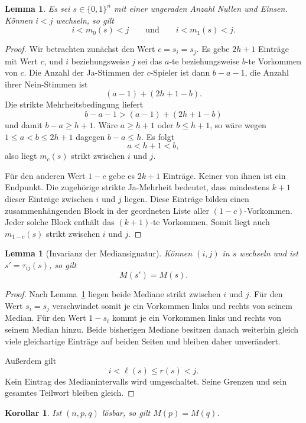 \documentclass[12pt]{article}
\newtheorem{lem}[thm]{Lemma}
\newtheorem{cor}[thm]{Korollar}
\begin{document}
\begin{lem}
Es sei $s\in\{0,1\}^n$ mit einer ungeraden Anzahl Nullen und Einsen. Können
$i<j$ wechseln, so gilt
\[
i<m_0(s)<j
\qquad\text{und}\qquad
i<m_1(s)<j.
\]
\label{lem:beide-mediane-dazwischen}
\end{lem}

\begin{proof}
Wir betrachten zunächst den Wert $c=s_i=s_j$. Es gebe $2h+1$ Einträge mit
Wert $c$, und $i$ beziehungsweise $j$ sei das $a$-te beziehungsweise $b$-te
Vorkommen von $c$. Die Anzahl der Ja-Stimmen der $c$-Spieler ist dann
$b-a-1$, die Anzahl ihrer Nein-Stimmen ist
\[
(a-1)+(2h+1-b).
\]
Die strikte Mehrheitsbedingung liefert
\[
b-a-1>(a-1)+(2h+1-b)
\]
und damit $b-a\geq h+1$. Wäre $a\geq h+1$ oder $b\leq h+1$, so wäre wegen
$1\leq a<b\leq 2h+1$ dagegen $b-a\leq h$. Es folgt
\[
a<h+1<b,
\]
also liegt $m_c(s)$ strikt zwischen $i$ und $j$.

Für den anderen Wert $1-c$ gebe es $2k+1$ Einträge. Keiner von ihnen ist ein
Endpunkt. Die zugehörige strikte Ja-Mehrheit bedeutet, dass mindestens $k+1$
dieser Einträge zwischen $i$ und $j$ liegen. Diese Einträge bilden einen
zusammenhängenden Block in der geordneten Liste aller $(1-c)$-Vorkommen. Jeder
solche Block enthält das $(k+1)$-te Vorkommen. Somit liegt auch $m_{1-c}(s)$
strikt zwischen $i$ und $j$.
\end{proof}

\begin{lem}[Invarianz der Mediansignatur]
Können $(i,j)$ in $s$ wechseln und ist $s'=\tau_{ij}(s)$, so gilt
\[
M(s')=M(s).
\]
\label{lem:mediansignatur-invariant}
\end{lem}

\begin{proof}
Nach Lemma~\ref{lem:beide-mediane-dazwischen} liegen beide Mediane strikt
zwischen $i$ und $j$. Für den Wert $s_i=s_j$ verschwindet somit je ein
Vorkommen links und rechts von seinem Median. Für den Wert $1-s_i$ kommt je
ein Vorkommen links und rechts von seinem Median hinzu. Beide bisherigen
Mediane besitzen danach weiterhin gleich viele gleichartige Einträge auf
beiden Seiten und bleiben daher unverändert.

Außerdem gilt
\[
i<\ell(s)\leq r(s)<j.
\]
Kein Eintrag des Medianintervalls wird umgeschaltet. Seine Grenzen und sein
gesamtes Teilwort bleiben gleich.
\end{proof}

\begin{cor}
Ist $(n,p,q)$ lösbar, so gilt $M(p)=M(q)$.
\label{cor:mediansignatur-notwendig}
\end{cor}
\end{document}
